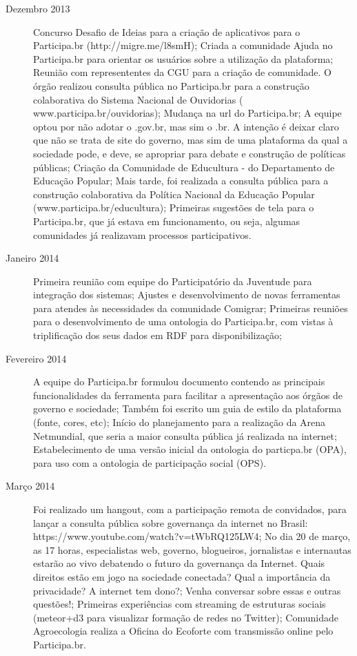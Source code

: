 \documentclass{article}
\begin{document}
\begin{description}
  \item [Dezembro 2013]
  Concurso Desafio de Ideias para a criação de aplicativos para o Participa.br (http://migre.me/l8smH);
  Criada a comunidade Ajuda no Participa.br para orientar os usuários sobre a utilização da plataforma;
  Reunião com represententes da CGU para a criação de comunidade. O órgão realizou consulta pública no Participa.br para a construção colaborativa  do Sistema Nacional de Ouvidorias ( www.participa.br/ouvidorias);
  Mudança na url do Participa.br;
  A equipe optou por não adotar o .gov.br, mas sim o .br. A intenção é deixar claro que não se trata de site do governo, mas sim de uma plataforma da qual a sociedade pode, e deve, se apropriar para debate e construção de políticas públicas;
  Criação da Comunidade de Educultura - do Departamento de Educação Popular;
  Mais tarde, foi realizada a consulta pública para a construção colaborativa da Política Nacional da Educação Popular (www.participa.br/educultura);
  Primeiras sugestões de tela para o Participa.br, que já estava em funcionamento, ou seja, algumas comunidades já realizavam processos participativos.

  \item [Janeiro 2014]
  Primeira reunião com equipe do Participatório da Juventude para integração dos sistemas;
  Ajustes e desenvolvimento de novas ferramentas para atendes às necessidades da comunidade Comigrar;
  Primeiras reuniões para o desenvolvimento de uma ontologia do Participa.br, com vistas à triplificação dos seus dados em RDF para disponibilização;

  \item [Fevereiro 2014]
  A equipe do Participa.br formulou documento contendo as principais funcionalidades da ferramenta para facilitar a apresentação aos órgãos de governo e sociedade;
  Também foi escrito um guia de estilo da plataforma (fonte, cores, etc);
  Início do planejamento para a realização da Arena Netmundial, que seria a maior consulta pública já realizada na internet;
  Estabelecimento de uma versão inicial da ontologia do particpa.br (OPA), para uso com a ontologia de participação social (OPS).

  \item [Março 2014]
  Foi realizado um hangout, com a participação remota de convidados, para lançar a consulta pública sobre governança da internet no Brasil: https://www.youtube.com/watch?v=tWbRQ125LW4;
  No dia 20 de março, as 17 horas, especialistas web, governo, blogueiros, jornalistas e internautas estarão ao vivo debatendo o futuro da governança da Internet. Quais direitos estão em jogo na sociedade conectada? Qual a importância da privacidade? A internet tem dono?;
  Venha conversar sobre essas e outras questões!;
  Primeiras experiências com streaming de estruturas sociais (meteor+d3 para visualizar formação de redes no Twitter);
  Comunidade Agroecologia realiza a Oficina do Ecoforte com transmissão online pelo Participa.br.


\end{description}
\end{document}

